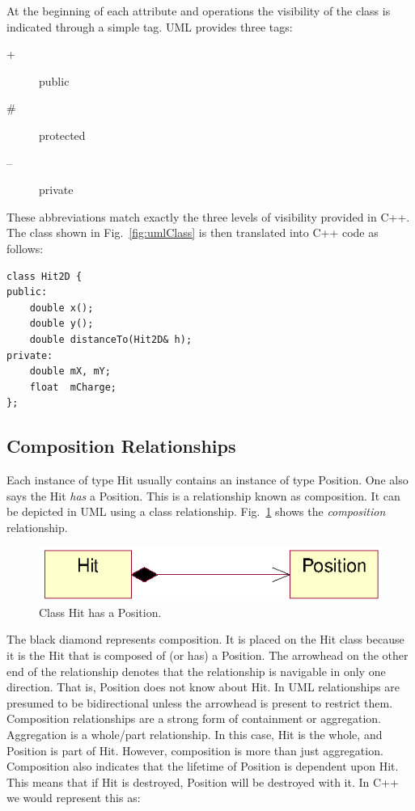 \documentclass[twoside]{article}
\begin{document}
At the beginning of each attribute and operations the visibility of
the class is indicated through a simple tag. UML provides three tags:
\begin{description}
\item[+] public
\item[\#] protected
\item[--] private
\end{description}
These abbreviations match exactly the three levels of visibility
provided in C++. The class shown in Fig.~\ref{fig:umlClass} is then
translated into C++ code as follows:

{\footnotesize
\begin{verbatim}
class Hit2D {
public:
    double x();
    double y();
    double distanceTo(Hit2D& h);
private:
    double mX, mY;
    float  mCharge;
};
\end{verbatim}
}%

\subsection{Composition Relationships}

Each instance of type Hit usually contains an instance of type
Position. One also says the Hit \emph{has} a Position. This is a
relationship known as composition. It can be depicted in UML using a
class relationship.  Fig.~\ref{fig:umlComposition} shows the
\emph{composition} relationship.
\begin{figure}[htb]
    \begin{center}
        \includegraphics{umlComposition.eps}
        \caption{Class Hit has a Position.}
        \label{fig:umlComposition}
    \end{center}
\end{figure}
The black diamond represents composition. It is placed on the Hit
class because it is the Hit that is composed of (or has) a Position.
The arrowhead on the other end of the relationship denotes that the
relationship is navigable in only one direction. That is, Position
does not know about Hit. In UML relationships are presumed to be
bidirectional unless the arrowhead is present to restrict them.
Composition relationships are a strong form of containment or
aggregation. Aggregation is a whole/part relationship. In this case,
Hit is the whole, and Position is part of Hit. However, composition is
more than just aggregation. Composition also indicates that the
lifetime of Position is dependent upon Hit. This means that if Hit is
destroyed, Position will be destroyed with it.  In C++ we would
represent this as:
\end{document}
